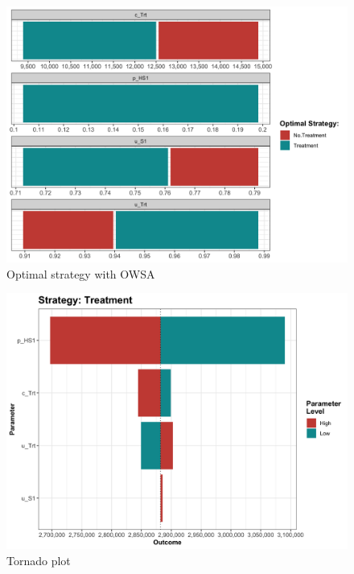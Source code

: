 \documentclass[]{book}
\begin{document}
\begin{figure}

{\centering \includegraphics[width=1\linewidth]{../figs/05b_optimal_owsa_lrm_nmb} 

}

\caption{Optimal strategy with OWSA}\label{fig:05b-optimal-owsa-lrm-nmb}
\end{figure}

\begin{figure}

{\centering \includegraphics[width=1\linewidth]{../figs/05b_tornado_lrm_Treatment_nmb} 

}

\caption{Tornado plot}\label{fig:05b-tornado-lrm-Treatment-nmb}
\end{figure}
\end{document}
